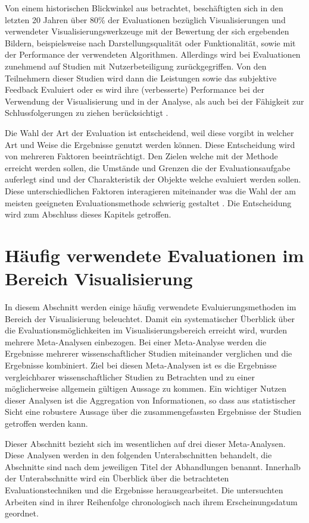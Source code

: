 \documentclass[draft=false
              ,paper=a4
              ,twoside=false
              ,fontsize=11pt
              ,headsepline
              ,BCOR10mm
              ,DIV11
              ]{scrbook}
\begin{document}
Von einem historischen Blickwinkel aus betrachtet, beschäftigten sich in den letzten 20 Jahren über 80\% der Evaluationen bezüglich Visualisierungen und verwendeter Visualisierungswerkzeuge mit der Bewertung der sich ergebenden Bildern, beispielsweise nach Darstellungsqualität oder Funktionalität, sowie mit der Performance der verwendeten Algorithmen. Allerdings wird bei Evaluationen zunehmend auf Studien mit Nutzerbeteiligung zurückgegriffen. Von den Teilnehmern dieser Studien wird dann die Leistungen sowie das subjektive Feedback Evaluiert oder es wird ihre (verbesserte) Performance bei der Verwendung der Visualisierung und in der Analyse, als auch bei der Fähigkeit zur Schlussfolgerungen zu ziehen berücksichtigt \cite{isenberg_systematic_2013}. 

Die Wahl der Art der Evaluation ist entscheidend, weil diese vorgibt in welcher Art und Weise die Ergebnisse genutzt werden können. Diese Entscheidung wird von mehreren Faktoren beeinträchtigt. Den Zielen welche mit der Methode erreicht werden sollen, die Umstände und Grenzen die der Evaluationsaufgabe auferlegt sind und der Charakteristik der Objekte welche evaluiert werden sollen. Diese unterschiedlichen Faktoren interagieren miteinander was die Wahl der am meisten geeigneten Evaluationsmethode schwierig gestaltet \cite{kitchenham_evaluating_1996-2}. Die Entscheidung wird zum Abschluss dieses Kapitels getroffen.

\section{Häufig verwendete Evaluationen im Bereich Visualisierung} %
\label{sec:häufig_verwendete_Evaluationen im Bereich Visualisierung}
In diesem Abschnitt werden einige häufig verwendete Evaluierungsmethoden im Bereich der Visualisierung beleuchtet. Damit ein systematischer Überblick über die Evaluationsmöglichkeiten im Visualisierungsbereich erreicht wird, wurden mehrere Meta-Analysen einbezogen. Bei einer Meta-Analyse werden die Ergebnisse mehrerer wissenschaftlicher Studien miteinander verglichen und die Ergebnisse kombiniert. Ziel bei diesen Meta-Analysen ist es die Ergebnisse vergleichbarer wissenschaftlicher Studien zu Betrachten und zu einer möglicherweise allgemein gültigen Aussage zu kommen. Ein wichtiger Nutzen dieser Analysen ist die Aggregation von Informationen, so dass aus statistischer Sicht eine robustere Aussage über die zusammengefassten Ergebnisse der Studien getroffen werden kann. 

Dieser Abschnitt bezieht sich im wesentlichen auf drei dieser Meta-Analysen. Diese Analysen werden in den folgenden Unterabschnitten behandelt, die Abschnitte sind nach dem jeweiligen Titel der Abhandlungen benannt. Innerhalb der Unterabschnitte wird ein Überblick über die betrachteten Evaluationstechniken und die Ergebnisse herausgearbeitet. Die untersuchten Arbeiten sind in ihrer Reihenfolge chronologisch nach ihrem Erscheinungsdatum geordnet.
\end{document}
